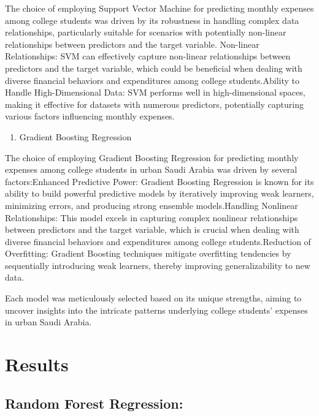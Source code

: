 \documentclass[
]{article}
\providecommand{\tightlist}{%
  \setlength{\itemsep}{0pt}\setlength{\parskip}{0pt}}
\begin{document}
The choice of employing Support Vector Machine for predicting monthly
expenses among college students was driven by its robustness in handling
complex data relationships, particularly suitable for scenarios with
potentially non-linear relationships between predictors and the target
variable. Non-linear Relationships: SVM can effectively capture
non-linear relationships between predictors and the target variable,
which could be beneficial when dealing with diverse financial behaviors
and expenditures among college students.Ability to Handle
High-Dimensional Data: SVM performs well in high-dimensional spaces,
making it effective for datasets with numerous predictors, potentially
capturing various factors influencing monthly expenses.

\begin{enumerate}
\def\labelenumi{\arabic{enumi}.}
\setcounter{enumi}{3}
\tightlist
\item
  Gradient Boosting Regression
\end{enumerate}

The choice of employing Gradient Boosting Regression for predicting
monthly expenses among college students in urban Saudi Arabia was driven
by several factors:Enhanced Predictive Power: Gradient Boosting
Regression is known for its ability to build powerful predictive models
by iteratively improving weak learners, minimizing errors, and producing
strong ensemble models.Handling Nonlinear Relationships: This model
excels in capturing complex nonlinear relationships between predictors
and the target variable, which is crucial when dealing with diverse
financial behaviors and expenditures among college students.Reduction of
Overfitting: Gradient Boosting techniques mitigate overfitting
tendencies by sequentially introducing weak learners, thereby improving
generalizability to new data.

Each model was meticulously selected based on its unique strengths,
aiming to uncover insights into the intricate patterns underlying
college students' expenses in urban Saudi Arabia.

\hypertarget{results}{%
\section{Results}\label{results}}

\hypertarget{random-forest-regression}{%
\subsection{Random Forest Regression:}\label{random-forest-regression}}
\end{document}
